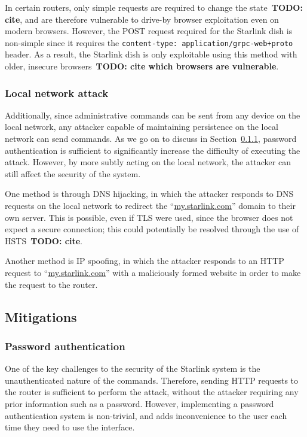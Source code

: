 In certain routers, only simple requests are required to change the state~\textbf{TODO: cite}, and are therefore vulnerable to drive-by browser exploitation even on modern browsers.
However, the POST request required for the Starlink dish is non-simple since it requires the \texttt{content-type: application/grpc-web+proto} header.
As a result, the Starlink dish is only exploitable using this method with older, insecure browsers~\textbf{TODO: cite which browsers are vulnerable}.

\subsubsection{Local network attack}

Additionally, since administrative commands can be sent from any device on the local network, any attacker capable of maintaining persistence on the local network can send commands.
As we go on to discuss in Section~\ref{sec:password_authentication}, password authentication is sufficient to significantly increase the difficulty of executing the attack.
However, by more subtly acting on the local network, the attacker can still affect the security of the system.

One method is through DNS hijacking, in which the attacker responds to DNS requests on the local network to redirect the ``\url{my.starlink.com}'' domain to their own server.
This is possible, even if TLS were used, since the browser does not expect a secure connection; this could potentially be resolved through the use of HSTS~\textbf{TODO: cite}.

Another method is IP spoofing, in which the attacker responds to an HTTP request to ``\url{my.starlink.com}'' with a maliciously formed website in order to make the request to the router.

\subsection{Mitigations}

\subsubsection{Password authentication}\label{sec:password_authentication}

One of the key challenges to the security of the Starlink system is the unauthenticated nature of the commands.
Therefore, sending HTTP requests to the router is sufficient to perform the attack, without the attacker requiring any prior information such as a password.
However, implementing a password authentication system is non-trivial, and adds inconvenience to the user each time they need to use the interface.

